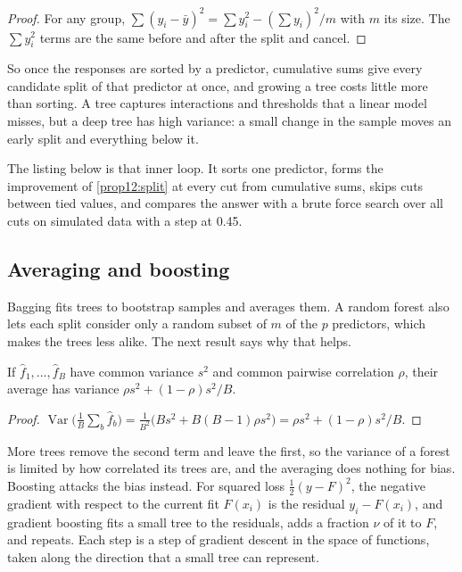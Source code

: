 \begin{chapterrefs}
\begin{proof}
For any group, $\sum(y_i-\bar y)^2=\sum y_i^2-(\sum y_i)^2/m$ with $m$ its size. The $\sum y_i^2$ terms are the
same before and after the split and cancel.
\end{proof}

So once the responses are sorted by a predictor, cumulative sums give every candidate split of that
predictor at once, and growing a tree costs little more than sorting. A tree captures interactions and
thresholds that a linear model misses, but a deep tree has high variance: a small change in the sample
moves an early split and everything below it.

The listing below is that inner loop. It sorts one predictor, forms the improvement of
\cref{prop12:split} at every cut from cumulative sums, skips cuts between tied values, and compares the
answer with a brute force search over all cuts on simulated data with a step at 0.45.


\subsection{Averaging and boosting}

Bagging \parencite{breiman1996} fits trees to bootstrap samples and averages them. A random forest
\parencite{breiman2001} also lets each split consider only a random subset of $m$ of the $p$ predictors, which
makes the trees less alike. The next result says why that helps.

\begin{proposition}\label{prop12:avg}
If $\hat f_1,\dots,\hat f_B$ have common variance $s^2$ and common pairwise correlation $\rho$, their average has
variance $\rho s^2+(1-\rho)s^2/B$.
\end{proposition}

\begin{proof}
$\operatorname{Var}\bigl(\tfrac1B\sum_b\hat f_b\bigr)=\tfrac1{B^2}\bigl(Bs^2+B(B-1)\rho s^2\bigr)=\rho s^2+(1-\rho)s^2/B$.
\end{proof}

More trees remove the second term and leave the first, so the variance of a forest is limited by how
correlated its trees are, and the averaging does nothing for bias. Boosting attacks the bias instead.
For squared loss $\tfrac12(y-F)^2$, the negative gradient with respect to the current fit $F(x_i)$ is the
residual $y_i-F(x_i)$, and gradient boosting \parencite{friedman2001} fits a small tree to the residuals,
adds a fraction $\nu$ of it to $F$, and repeats. Each step is a step of gradient descent in the space of
functions, taken along the direction that a small tree can represent.


\end{chapterrefs}

